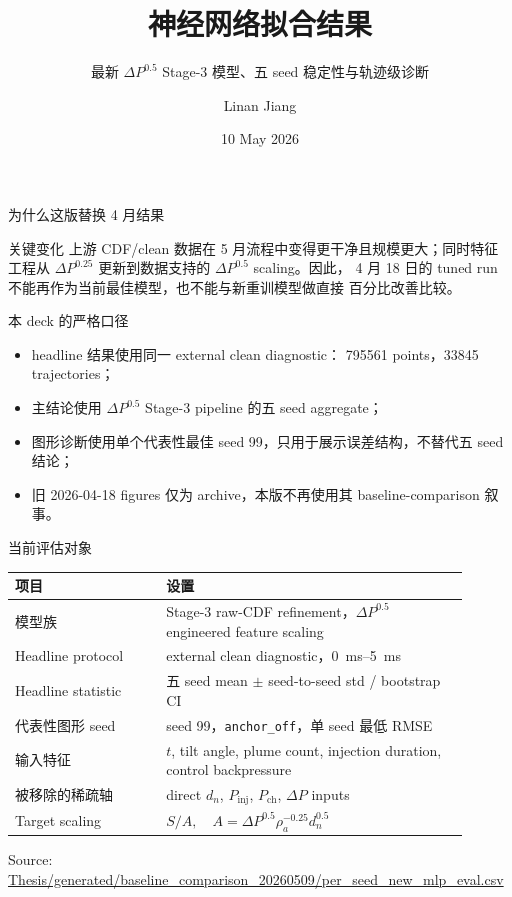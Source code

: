 \documentclass[aspectratio=169,11pt]{beamer}
\title[NN Fitting Results]{神经网络拟合结果}
\subtitle{最新 \texorpdfstring{\(\Delta P^{0.5}\)}{Delta P\textasciicircum 0.5} Stage-3 模型、五 seed 稳定性与轨迹级诊断}
\author{Linan Jiang}
\institute{Aalto University}
\date{10 May 2026}
\newcommand{\src}[1]{\vfill{\tiny\textcolor{gray!75!black}{Source: \url{#1}}}}
\begin{document}
\begin{frame}
  \titlepage
\end{frame}

\begin{frame}{为什么这版替换 4 月结果}
\small
\begin{block}{关键变化}
上游 CDF/clean 数据在 5 月流程中变得更干净且规模更大；同时特征工程从
\(\Delta P^{0.25}\) 更新到数据支持的 \(\Delta P^{0.5}\) scaling。因此，
4 月 18 日的 tuned run 不能再作为当前最佳模型，也不能与新重训模型做直接
百分比改善比较。
\end{block}

\begin{block}{本 deck 的严格口径}
\begin{itemize}
  \item headline 结果使用同一 external clean diagnostic：
  \num{795561} points，\num{33845} trajectories；
  \item 主结论使用 \(\Delta P^{0.5}\) Stage-3 pipeline 的五 seed aggregate；
  \item 图形诊断使用单个代表性最佳 seed 99，只用于展示误差结构，不替代五 seed 结论；
  \item 旧 2026-04-18 figures 仅为 archive，本版不再使用其 baseline-comparison 叙事。
\end{itemize}
\end{block}
\end{frame}

\begin{frame}{当前评估对象}
\small
\begin{tabular}{L{0.30\linewidth}L{0.60\linewidth}}
\toprule
项目 & 设置 \\
\midrule
模型族 & Stage-3 raw-CDF refinement，\(\Delta P^{0.5}\) engineered feature scaling \\
Headline protocol & external clean diagnostic，\SIrange{0}{5}{ms} \\
Headline statistic & 五 seed mean \(\pm\) seed-to-seed std / bootstrap CI \\
代表性图形 seed & seed 99，\texttt{anchor\_off}，单 seed 最低 RMSE \\
输入特征 & \(t\), tilt angle, plume count, injection duration, control backpressure \\
被移除的稀疏轴 & direct \(d_n\), \(P_{\mathrm{inj}}\), \(P_{\mathrm{ch}}\), \(\Delta P\) inputs \\
Target scaling & \(S/A,\quad A=\Delta P^{0.5}\rho_a^{-0.25}d_n^{0.5}\) \\
\bottomrule
\end{tabular}

\src{Thesis/generated/baseline_comparison_20260509/per_seed_new_mlp_eval.csv}
\end{frame}
\end{document}
